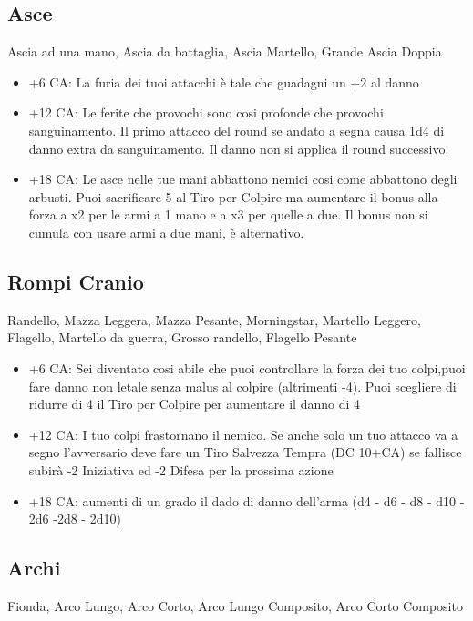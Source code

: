 \documentclass[a4paper,11pt,twoside,openany]{book}
\begin{document}
\subsection{Asce} Ascia ad una mano, Ascia da battaglia, Ascia Martello, Grande Ascia Doppia

\begin{itemize}

	\item +6 CA: La furia dei tuoi attacchi è tale che guadagni un +2 al danno

	\item +12 CA: Le ferite che provochi sono cosi profonde che provochi sanguinamento. Il primo attacco del round se andato a segna causa 1d4 di danno extra da sanguinamento. Il danno non si applica il round successivo.

	\item +18 CA: Le asce nelle tue mani abbattono nemici cosi come abbattono degli arbusti. Puoi sacrificare 5 al Tiro per Colpire ma aumentare il bonus alla forza a x2 per le armi a 1 mano e a x3 per quelle a due. Il bonus non si cumula con usare armi a due mani, è alternativo.

\end{itemize}

\subsection{Rompi Cranio} Randello, Mazza Leggera, Mazza Pesante, Morningstar, Martello Leggero, Flagello, Martello da guerra, Grosso randello, Flagello Pesante

\begin{itemize}
	\item +6 CA: Sei diventato cosi abile che puoi controllare la forza dei tuo colpi,puoi fare danno non letale senza malus al colpire (altrimenti -4). Puoi scegliere di ridurre di 4 il Tiro per Colpire per aumentare il danno di 4

	\item +12 CA: I tuo colpi frastornano il nemico. Se anche solo un tuo attacco va a segno l'avversario deve fare un Tiro Salvezza Tempra (DC 10+CA) se fallisce subirà -2 Iniziativa ed -2 Difesa per la prossima azione

	\item +18 CA: aumenti di un grado il dado di danno dell'arma (d4 - d6 - d8 - d10 - 2d6 -2d8 - 2d10)
\end{itemize}

\subsection{Archi} Fionda, Arco Lungo, Arco Corto, Arco Lungo Composito, Arco Corto Composito
\end{document}
